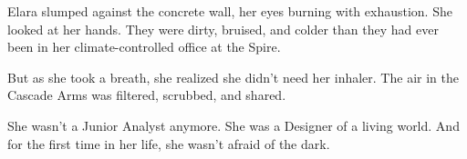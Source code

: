 
Elara slumped against the concrete wall, her eyes burning with exhaustion. She looked at her hands. They were dirty, bruised, and colder than they had ever been in her climate-controlled office at the Spire. 

But as she took a breath, she realized she didn't need her inhaler. The air in the Cascade Arms was filtered, scrubbed, and shared. 

She wasn't a Junior Analyst anymore. She was a Designer of a living world. And for the first time in her life, she wasn't afraid of the dark.
